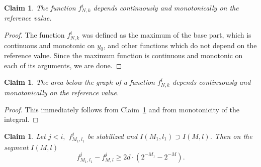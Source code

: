 \documentclass[12pt]{article}
\newtheorem{clai}[prop]{Claim}
\theoremstyle{definition}
\begin{document}
\begin{clai}
\label{monotonicity-claim1}
The function $f_{N,k}^i$ depends continuously and monotonically on the reference value.
\end{clai}

\begin{proof}
The function $f_{N,k}^i$ was defined as the maximum of the base part, which is continuous and monotonic on $y_0$, and other functions which do not depend on the reference value. Since the maximum function is continuous and monotonic on each of its arguments, we are done.
\end{proof}

\begin{clai}
\label{monotonicity-claim2}
The area below the graph of a function $f_{N,k}^i$ depends continuously and monotonically on the reference value.
\end{clai}

\begin{proof}
This immediately follows from Claim~\ref{monotonicity-claim1} and from monotonicity of the integral.
\end{proof}

\begin{clai}
\label{domination-of-stabilized}
Let $j<i,$ $f_{M_1, l_1}^j$ be stabilized and $I(M_1,l_1)\supset I(M,l)$.
Then on the segment $I(M,l)$
\begin{equation}
\label{domination-inequality}
f_{M_1, l_1}^{j} - f_{M, l}^{j} \ge 2d\cdot \left(2^{-M_1} - 2^{-M}\right).
\end{equation}
\end{clai}
\end{document}
